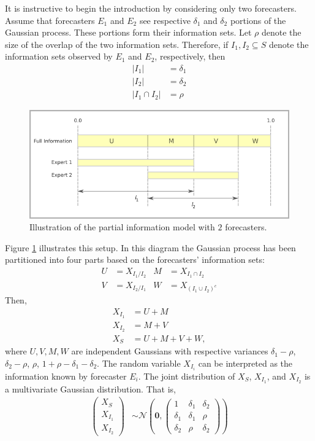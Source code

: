 \documentclass[11pt]{article}
\theoremstyle{definition}
\theoremstyle{definition}
\begin{document}
It is instructive to begin the introduction by considering only 
two forecasters.  Assume that forecasters $E_1$ and $E_2$ see respective 
$\delta_1$ and $\delta_2$ portions of the Gaussian process. 
These portions form their information sets.  Let $\rho$ denote
the size of the overlap of the two information sets.
Therefore, if $I_1, I_2 \subseteq S$ denote the information 
sets observed by $E_1$ and $E_2$, respectively, then
\begin{align*}
|I_1| &= \delta_1\\
|I_2| &= \delta_2\\
|I_1 \cap I_2| &= \rho
\end{align*}
\begin{figure}[htbp]
   \includegraphics[width = \textwidth]{N=2} %
   \caption{Illustration of the partial information model with $2$ forecasters.}
   \label{diagram2}
\end{figure}
Figure \ref{diagram2} illustrates this setup.  In this diagram the 
Gaussian process has been partitioned into four parts based on the 
forecasters' information sets:
\begin{align*}
 U &= X_{I_1 / I_2}
& M &= X_{I_1 \cap I_2}\\
 V &= X_{I_2 / I_1}
& W &= X_{(I_1 \cup I_2)^c}
\end{align*}
Then,
\begin{align*}
X_{I_1} &= U + M\\
X_{I_2} &= M + V\\
X_S &= U+M+V+W,
\end{align*}
where $U, V, M, W$ are independent Gaussians with respective variances 
$\delta_1-\rho$, $\delta_2-\rho$, $\rho$, $1+\rho-\delta_1 - \delta_2$. 
The random variable $X_{I_i}$ can be interpreted as the information 
known by forecaster $E_i$.  The joint distribution of $X_{S}$, $X_{I_1}$, 
and $X_{I_2}$ is a multivariate Gaussian distribution.  That is,
\begin{align}
\left(\begin{matrix} X_S \\ X_{I_1}\\ X_{I_2} \end{matrix}\right) 
 &\sim \mathcal{N}\left(
 \boldsymbol{0},  \left(\begin{matrix} 
1 & \delta_1 & \delta_2\\
\delta_1 & \delta_1 &\rho\\
\delta_2 & \rho & \delta_2
 \end{matrix}\right)\right) \label{twoforecasters}
\end{align}
\end{document}
